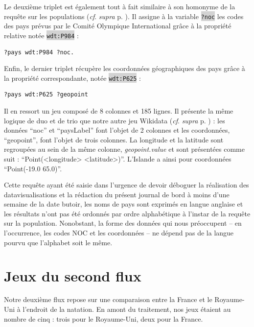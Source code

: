 \documentclass[hidelinks, 12pt]{report}
\newcommand{\code}[1]{\colorbox{LightGray}{\texttt{#1}}}
\begin{document}
Le deuxième triplet est également tout à fait similaire à son homonyme de la requête sur les populations (\textit{cf}. \textit{supra} p. \pageref{query1}). Il assigne à la variable \code{?noc} les codes des pays prévus par le Comité Olympique International grâce à la propriété relative notée \code{wdt:P984} :

\begin{lstlisting}[language=SPARQL]
	?pays wdt:P984 ?noc.
\end{lstlisting}

Enfin, le dernier triplet récupère les coordonnées géographiques des pays grâce à la propriété correspondante, notée \code{wdt:P625} :

\begin{lstlisting}[language=SPARQL]
	?pays wdt:P625 ?geopoint
\end{lstlisting}

Il en ressort un jeu composé de 8 colonnes et 185 lignes. Il présente la même logique de duo et de trio que notre autre jeu Wikidata (\textit{cf}. \textit{supra} p. \pageref{query1tab}) : les données \enquote{noc} et \enquote{paysLabel} font l'objet de 2 colonnes et les coordonnées, \enquote{geopoint}, font l'objet de trois colonnes. La longitude et la latitude sont regroupées au sein de la même colonne, \textit{geopoint.value} et sont présentées comme suit : \enquote{Point(<longitude> <latitude>)}. L'Islande a ainsi pour coordonnées \enquote{Point(-19.0 65.0)}.

Cette requête ayant été saisie dans l'urgence de devoir déboguer la réalisation des datavisualisations et la rédaction du présent journal de bord à moins d'une semaine de la date butoir, les noms de pays sont exprimés en langue anglaise et les résultats n'ont pas été ordonnés par ordre alphabétique à l'instar de la requête sur la population. Nonobstant, la forme des données qui nous préoccupent -- en l'occurrence, les codes NOC et les coordonnées -- ne dépend pas de la langue pourvu que l'alphabet soit le même.





%





\section{Jeux du second flux}

Notre deuxième flux repose sur une comparaison entre la France et le Royaume-Uni à l'endroit de la natation. En amont du traitement, nos jeux étaient au nombre de cinq : trois pour le Royaume-Uni, deux pour la France.
\end{document}
